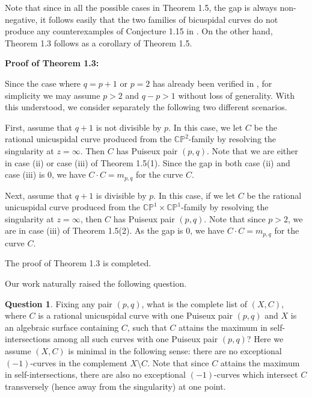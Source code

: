 \documentclass[11pt]{amsart}
\theoremstyle{plain}
\numberwithin{theorem}{section}
\theoremstyle{definition}
\newtheorem{question}[theorem]{Question}
\newcommand{\C}{{\mathbb C}}
\renewcommand{\P}{{\mathbb P}}
\begin{document}
Note that since in all the possible cases in Theorem 1.5, the gap is always non-negative, it follows easily that the two families of bicuspidal curves do not produce any counterexamples of 
Conjecture 1.15 in \cite{C}. On the other hand, Theorem 1.3 follows as a corollary of Theorem 1.5. 

\vspace{2mm}

{\bf Proof of Theorem 1.3:} 

\vspace{2mm}

Since the case where $q=p+1$ or $p=2$ has already been verified in \cite{C}, for simplicity we may assume $p>2$ and $q-p>1$ without loss of generality. With this understood, we consider separately the following two different scenarios. 

First, assume that $q+1$ is not divisible by $p$. In this case, we let $C$ be the rational unicuspidal curve produced from the $\C\P^2$-family by resolving the singularity at $z=\infty$. Then $C$ has 
Puiseux pair $(p,q)$. Note that we are either in case (ii) or case (iii) of Theorem 1.5(1). Since the gap in both case (ii) and case (iii) is $0$, we have $C\cdot C=m_{p,q}$ for the curve $C$. 

Next, assume that $q+1$ is divisible by $p$. In this case, if we let $C$ be the rational unicuspidal curve produced from the $\C\P^1\times \C\P^1$-family by resolving the singularity at $z=\infty$, then $C$ has Puiseux pair $(p,q)$. Note that since $p>2$, we are in case (iii) of Theorem 1.5(2). As the gap is $0$, we have $C\cdot C=m_{p,q}$ for the curve $C$. 

The proof of Theorem 1.3 is completed. 

\vspace{2mm}

Our work naturally raised the following question.

\begin{question}
Fixing any pair $(p,q)$, what is the complete list of $(X,C)$, where $C$ is a rational unicuspidal curve 
with one Puiseux pair $(p,q)$ and $X$ is an algebraic surface containing $C$, such that $C$ attains the maximum in self-intersections among all such curves with one Puiseux pair $(p,q)$? Here we assume 
$(X,C)$ is minimal in the following sense: there are no exceptional $(-1)$-curves in the complement 
$X\setminus C$. Note that since $C$ attains the maximum in self-intersections, there are also no exceptional $(-1)$-curves which intersect $C$ transversely (hence away from the singularity) at one point. 
\end{question}
\end{document}
